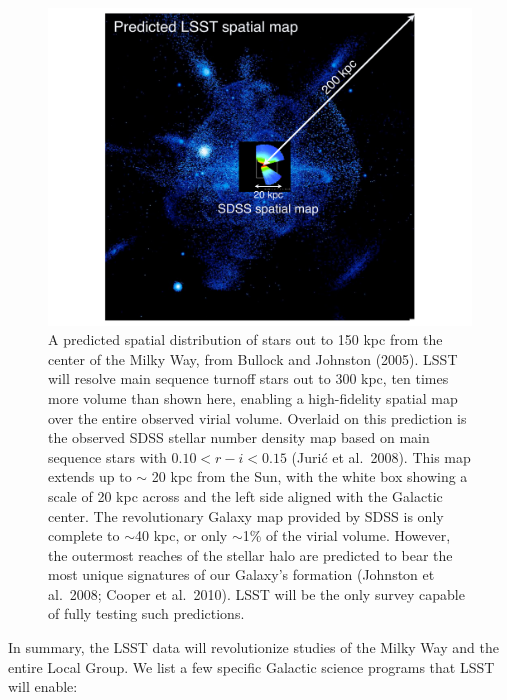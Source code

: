 \begin{figure}
\hskip -0.5in
\includegraphics[width=1.3\hsize,clip]{BethMWhalo.pdf}
\caption{A predicted spatial distribution of stars out to 150 kpc from the center of the Milky Way,
from Bullock and Johnston (2005).  LSST will resolve main sequence turnoff stars out to 300 kpc, ten times
more volume than shown here, enabling a high-fidelity spatial map over the entire observed virial volume.
Overlaid on this prediction is the observed SDSS stellar number density map based on main sequence stars
with $0.10 < r-i < 0.15$ (Juri\'{c} et al.~2008).  This map extends up to $\sim$ 20 kpc from the Sun, with
the white box showing a scale of 20 kpc across and the left side aligned with the Galactic center.
The revolutionary Galaxy map provided by SDSS is only complete to $\sim$40 kpc, or only $\sim$1\% of
the virial volume.  However, the outermost reaches of the stellar halo are predicted to bear the most unique
signatures of our Galaxy's formation (Johnston et al.~2008;  Cooper et al.~2010).   LSST will be the only survey
capable of fully testing such predictions.}
\label{Fig:halo}
\end{figure}



In summary, the LSST data will revolutionize studies of the Milky Way and the entire Local Group. We list a few specific
Galactic science programs that LSST will enable:

